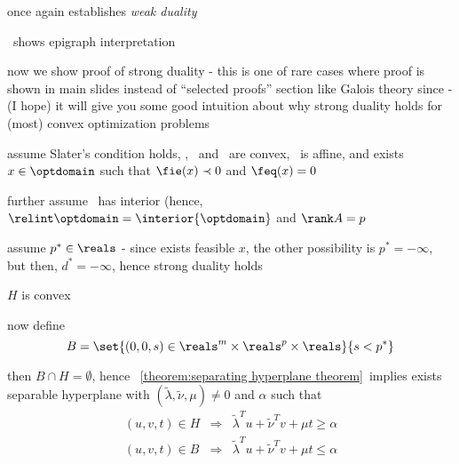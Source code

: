 \documentclass[17pt,landscape]{foils}
\begin{document}
{\item
	once again establishes \emph{weak duality}

\item
	\
	shows epigraph interpretation
\eit

\begin{figure}
\begin{center}
	\dualitygraphthree{\dualitygraphunitsize}
	\label{fig:geometric interpretation of duality - 3}
\end{center}
\end{figure}



\bit
\item
	now we show proof of strong duality
	- this is one of rare cases where proof is shown in main slides
	instead of ``selected proofs'' section like Galois theory
	since - (I hope) it will give you some good intuition about
	why strong duality holds for (most) convex optimization problems

\item
	assume Slater's condition holds,
	\ie,
	\fobj\ and \fie\ are convex, \feq\ is affine,
	and
	exists $x\in\optdomain$
	such that $\fie(x) \prec 0$ and $\feq(x) = 0$

\item
	further assume \optdomain\ has interior (hence, $\relint \optdomain = \interior{\optdomain}$
	and $\rank A=p$

\item
	assume $p^\ast\in\reals$ - since exists feasible $x$, the other possibility is $p^\ast = -\infty$,
	but then, $d^\ast = -\infty$, hence strong duality holds

\item
	$H$ is convex 

\item
	now define
	$$
		B = \set{(0,0,s)\in\reals^m\times\reals^p\times\reals}{s<p^\ast}
	$$

\item
	then $B\cap H=\emptyset$, hence \theoremname~\ref{theorem:separating hyperplane theorem}\
	implies exists separable hyperplane with $(\tilde{\lambda}, \tilde{\nu}, \mu)\neq 0$ and $\alpha$
	such that
	\begin{eqnarray*}
		(u,v,t) \in H
		&\Rightarrow&
		\tilde{\lambda}^T u + \tilde{\nu}^T v + \mu t \geq \alpha
	\\
		(u,v,t) \in B
		&\Rightarrow&
		\tilde{\lambda}^T u + \tilde{\nu}^T v + \mu t \leq \alpha
	\end{eqnarray*}

}
\end{document}
